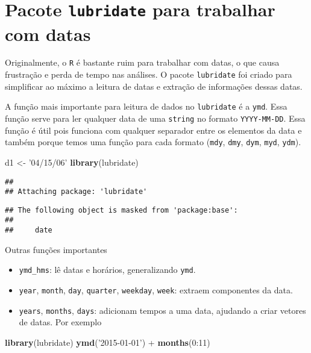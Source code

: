 \documentclass[]{book}
\newenvironment{Shaded}{\begin{snugshade}}{\end{snugshade}}
\newcommand{\KeywordTok}[1]{\textcolor[rgb]{0.13,0.29,0.53}{\textbf{{#1}}}}
\newcommand{\DecValTok}[1]{\textcolor[rgb]{0.00,0.00,0.81}{{#1}}}
\newcommand{\StringTok}[1]{\textcolor[rgb]{0.31,0.60,0.02}{{#1}}}
\newcommand{\NormalTok}[1]{{#1}}
\providecommand{\tightlist}{%
  \setlength{\itemsep}{0pt}\setlength{\parskip}{0pt}}
\begin{document}
\section{\texorpdfstring{Pacote \texttt{lubridate} para trabalhar com
datas}{Pacote lubridate para trabalhar com datas}}\label{pacote-lubridate-para-trabalhar-com-datas}

Originalmente, o \texttt{R} é bastante ruim para trabalhar com datas, o
que causa frustração e perda de tempo nas análises. O pacote
\texttt{lubridate} foi criado para simplificar ao máximo a leitura de
datas e extração de informações dessas datas.

A função mais importante para leitura de dados no \texttt{lubridate} é a
\texttt{ymd}. Essa função serve para ler qualquer data de uma
\texttt{string} no formato \texttt{YYYY-MM-DD}. Essa função é útil pois
funciona com qualquer separador entre os elementos da data e também
porque temos uma função para cada formato (\texttt{mdy}, \texttt{dmy},
\texttt{dym}, \texttt{myd}, \texttt{ydm}).

\begin{Shaded}
\begin{Highlighting}[]
\NormalTok{d1 <-}\StringTok{ '04/15/06'}
\KeywordTok{library}\NormalTok{(lubridate)}
\end{Highlighting}
\end{Shaded}

\begin{verbatim}
## 
## Attaching package: 'lubridate'
\end{verbatim}

\begin{verbatim}
## The following object is masked from 'package:base':
## 
##     date
\end{verbatim}

Outras funções importantes

\begin{itemize}
\tightlist
\item
  \texttt{ymd\_hms}: lê datas e horários, generalizando \texttt{ymd}.
\item
  \texttt{year}, \texttt{month}, \texttt{day}, \texttt{quarter},
  \texttt{weekday}, \texttt{week}: extraem componentes da data.
\item
  \texttt{years}, \texttt{months}, \texttt{days}: adicionam tempos a uma
  data, ajudando a criar vetores de datas. Por exemplo
\end{itemize}

\begin{Shaded}
\begin{Highlighting}[]
\KeywordTok{library}\NormalTok{(lubridate)}
\KeywordTok{ymd}\NormalTok{(}\StringTok{'2015-01-01'}\NormalTok{) +}\StringTok{ }\KeywordTok{months}\NormalTok{(}\DecValTok{0}\NormalTok{:}\DecValTok{11}\NormalTok{)}
\end{Highlighting}
\end{Shaded}
\end{document}
